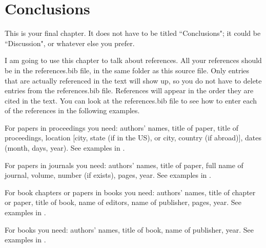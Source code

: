\chapter{Conclusions}\label{chap_conc}

This is your final chapter. 
It does not have to be titled ``Conclusions"; it could be ``Discussion", or whatever else you prefer.

I am going to use this chapter to talk about references.
All your references should be in the references.bib file, in the same folder as this source file.
Only entries that are actually referenced in the text will show up, so you do not have to delete entries from the references.bib file.
References will appear in the order they are cited in the text.
You can look at the references.bib file to see how to enter each of the references in the following examples.

For papers in proceedings you need: authors' names, title of paper, title of proceedings, location [city, state (if in the US), or city, country (if abroad)], dates (month, days, year).
See examples in \cite{proc1,proc2,proc3}.

For papers in journals you need: authors' names, title of paper, full name of journal, volume, number (if exists), pages, year.
See examples in \cite{artic1,artic2,artic3}.

For book chapters or papers in books you need: authors' names, title of chapter or paper, title of book, name of editors, name of publisher, pages, year.
See examples in \cite{chapter1,chapter2,chapter3}.

For books you need: authors' names, title of book, name of publisher, year.
See examples in \cite{book1,book2,book3}.